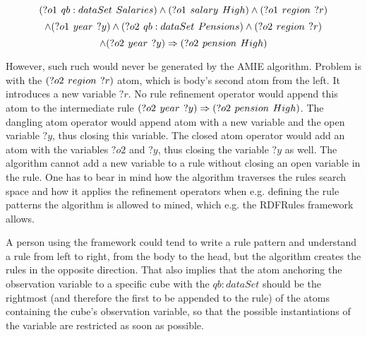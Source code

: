 \begin{minipage}{\textwidth}
$$
(?o1\hspace{0.4em}qb:dataSet\hspace{0.4em}Salaries) \land (?o1\hspace{0.4em}salary\hspace{0.4em}High) \land (?o1\hspace{0.4em}region\hspace{0.4em}?r) 
$$
$$
\land (?o1\hspace{0.4em}year\hspace{0.4em}?y) \land (?o2\hspace{0.4em}qb:dataSet\hspace{0.4em}Pensions) \land (?o2\hspace{0.4em}region\hspace{0.4em}?r)
$$
$$
\land (?o2\hspace{0.4em}year\hspace{0.4em}?y) \Rightarrow (?o2\hspace{0.4em}pension\hspace{0.4em}High)
$$
\end{minipage}

However, such ruch would never be generated by the AMIE algorithm. Problem is with the $(?o2\hspace{0.4em}region\hspace{0.4em}?r)$ atom, which is body's second atom from the left. It introduces a new variable $?r$. No rule refinement operator would append this atom to the intermediate rule $(?o2\hspace{0.4em}year\hspace{0.4em}?y) \Rightarrow (?o2\hspace{0.4em}pension\hspace{0.4em}High)$. The dangling atom operator would append atom with a new variable and the open variable $?y$, thus closing this variable. The closed atom operator would add an atom with the variables $?o2$ and $?y$, thus closing the variable $?y$ as well. The algorithm cannot add a new variable to a rule without closing an open variable in the rule. One has to bear in mind how the algorithm traverses the rules search space and how it applies the refinement operators when e.g. defining the rule patterns the algorithm is allowed to mined, which e.g. the RDFRules framework allows. 

A person using the framework could tend to write a rule pattern and understand a rule from left to right, from the body to the head, but the algorithm creates the rules in the opposite direction. That also implies that the atom anchoring the observation variable to a specific cube with the $qb:dataSet$ should be the rightmost (and therefore the first to be appended to the rule) of the atoms containing the cube's observation variable, so that the possible instantiations of the variable are restricted as soon as possible.
